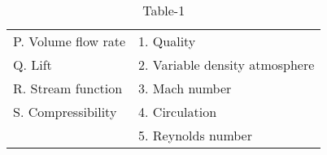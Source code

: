 \begin{table}[htbp]
\centering
\caption{Table-1}
\label{tab:tables/table1.tex}
\begin{tabular}{ll}
P. Volume flow rate & 1. Quality \\
Q. Lift & 2. Variable density atmosphere\\
R. Stream function & 3. Mach number \\
S. Compressibility & 4. Circulation\\
 & 5. Reynolds number 


\end{tabular}

\end{table}  